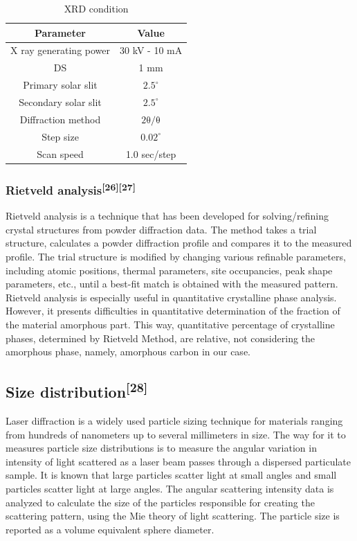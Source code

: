 \begin{table}[H]
\centering
\caption{XRD condition}
\begin{tabular}{cc}
\toprule
Parameter              & Value                                        \\
\midrule
X ray generating power & 30 kV - 10 mA                                  \\
DS                     & 1 mm                                          \\
Primary solar slit     & $2.5^{\circ}$                                         \\
Secondary solar slit   & $2.5^{\circ}$                                         \\
Diffraction method     & $\mathrm{2\theta /\theta}$  \\
Step size              & $0.02^{\circ}$                                        \\
Scan speed             & 1.0 sec/step    \\                      \bottomrule      
\end{tabular}
\end{table}
\subsubsection{Rietveld analysis\textsuperscript{[26][27]}}
Rietveld analysis is a technique that has been developed for solving/refining crystal structures from powder diffraction data. The method takes a trial structure, calculates a powder diffraction profile and compares it to the measured profile. The trial structure is modified by changing various refinable parameters, including atomic positions, thermal parameters, site occupancies, peak shape parameters, etc., until a best-fit match is obtained with the measured pattern.  Rietveld analysis is especially useful in  quantitative crystalline phase analysis. However, it presents difficulties in quantitative determination of the fraction of the material amorphous part. This way, quantitative percentage of crystalline phases, determined by Rietveld Method, are relative, not considering the amorphous phase, namely,  amorphous carbon in our case.

\subsection{Size distribution\textsuperscript{[28]}}
Laser diffraction is a widely used particle sizing technique for materials ranging from hundreds of nanometers up to several millimeters in size. The way for it to  measures particle size distributions is to measure the angular variation in intensity of light scattered as a laser beam passes through a dispersed particulate sample. It is known that large particles scatter light at small angles and small particles scatter light at large angles. The angular scattering intensity data is analyzed to calculate the size of the particles responsible for creating the scattering pattern, using the Mie theory of light scattering. The particle size is reported as a volume equivalent sphere diameter.

